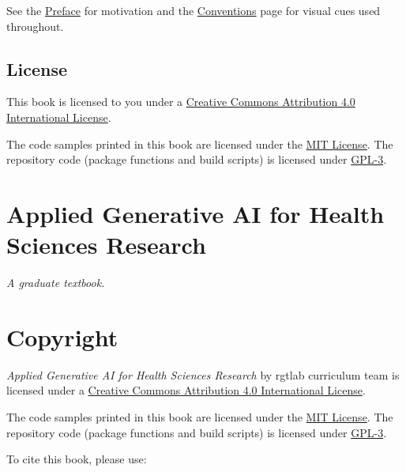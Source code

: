 \documentclass[
  letterpaper,
  11pt]{scrbook}
\begin{document}
See the \href{preface.qmd}{Preface} for motivation and the
\href{conventions.qmd}{Conventions} page for visual cues used
throughout.

\section*{License}\label{license}


This book is licensed to you under a
\href{https://creativecommons.org/licenses/by/4.0/}{Creative
Commons Attribution 4.0 International
License}.

The code samples printed in this book are licensed under the
\href{https://opensource.org/license/mit}{MIT License}. The
repository code (package functions and build scripts) is licensed
under \href{https://www.gnu.org/licenses/gpl-3.0.html}{GPL-3}.


\chapter*{Applied Generative AI for Health Sciences
Research}\label{applied-generative-ai-for-health-sciences-research}


\emph{A graduate textbook.}


\chapter*{Copyright}\label{copyright}


\emph{Applied Generative AI for Health Sciences Research} by rgtlab
curriculum team is licensed under a
\href{https://creativecommons.org/licenses/by/4.0/}{Creative
Commons Attribution 4.0 International
License}.

The code samples printed in this book are licensed under the
\href{https://opensource.org/license/mit}{MIT License}. The
repository code (package functions and build scripts) is licensed
under \href{https://www.gnu.org/licenses/gpl-3.0.html}{GPL-3}.

To cite this book, please use:
\end{document}
